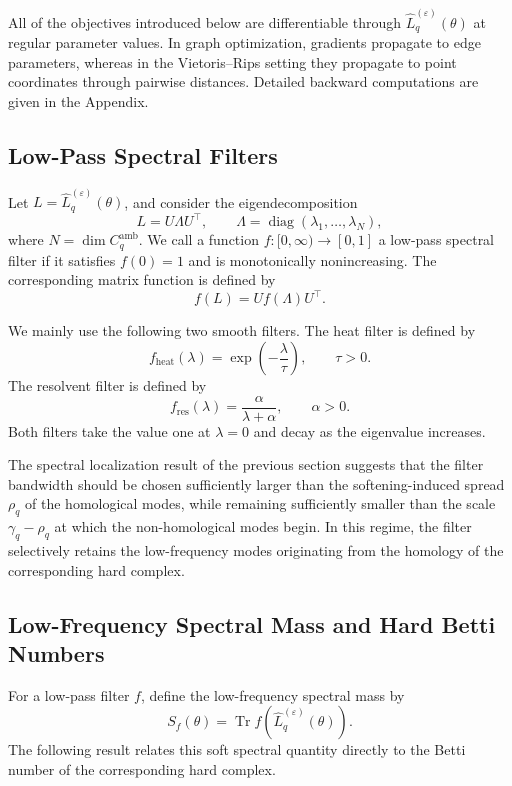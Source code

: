 \documentclass[pdflatex,sn-mathphys-num]{sn-jnl}%
\theoremstyle{thmstyleone}%
\theoremstyle{thmstyletwo}%
\theoremstyle{thmstylethree}%
\begin{document}
All of the objectives introduced below are differentiable through
\(\widehat L_q^{(\varepsilon)}(\theta)\) at regular parameter values. In graph optimization, gradients propagate to edge parameters, whereas in the Vietoris--Rips setting they propagate to point coordinates through pairwise distances. Detailed backward computations are given in the Appendix.


\subsection{Low-Pass Spectral Filters}

Let
$L
=
\widehat L_q^{(\varepsilon)}(\theta)$,
and consider the eigendecomposition
\[
L
=
U\Lambda U^\top,
\qquad
\Lambda
=
\operatorname{diag}
(\lambda_1,\ldots,\lambda_N),
\]
where $N=\dim C_q^{\mathrm{amb}}$.
We call a function $f:[0,\infty)\to[0,1]$
a low-pass spectral filter if it satisfies $f(0)=1$
and is monotonically nonincreasing.
The corresponding matrix function is defined by
\[
f(L)
=
Uf(\Lambda)U^\top.
\]

We mainly use the following two smooth filters.
The heat filter is defined by
\[
f_{\mathrm{heat}}(\lambda)
=
\exp\left(
-\frac{\lambda}{\tau}
\right),
\qquad
\tau>0.
\]
The resolvent filter is defined by
\[
f_{\mathrm{res}}(\lambda)
=
\frac{\alpha}{\lambda+\alpha},
\qquad
\alpha>0.
\]
Both filters take the value one at \(\lambda=0\) and decay as the eigenvalue increases.

The spectral localization result of the previous section suggests that the filter bandwidth should be chosen sufficiently larger than the softening-induced spread \(\rho_q\) of the homological modes, while remaining sufficiently smaller than the scale $\gamma_q-\rho_q$
at which the non-homological modes begin.
In this regime, the filter selectively retains the low-frequency modes originating from the homology of the corresponding hard complex.


\subsection{Low-Frequency Spectral Mass and Hard Betti Numbers}

For a low-pass filter \(f\), define the low-frequency spectral mass by
\[
S_f(\theta)
=
\operatorname{Tr}
f\left(
\widehat L_q^{(\varepsilon)}(\theta)
\right).
\]
The following result relates this soft spectral quantity directly to the Betti number of the corresponding hard complex.
\end{document}
